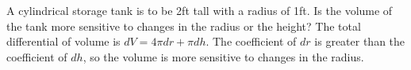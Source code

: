 {A cylindrical storage tank is to be 2ft tall with a radius of 1ft. Is the volume of the tank more sensitive to changes in the radius or the height?
}
{The total differential of volume is $dV = 4\pi dr + \pi dh$. The coefficient of $dr$ is greater than the coefficient of $dh$, so the volume is more sensitive to changes in the radius.
}